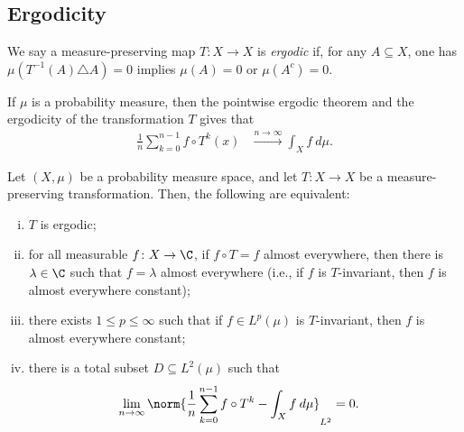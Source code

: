 \documentclass[10pt]{mypackage}
\begin{document}
\subsection{Ergodicity}%
\begin{definition}
  We say a measure-preserving map $T\colon X\rightarrow X$ is \textit{ergodic} if, for any $A\subseteq X$, one has $\mu\left( T^{-1}\left( A \right)\triangle A \right) = 0$ implies $\mu\left( A \right) = 0$ or $\mu\left( A^{c} \right) = 0$.
\end{definition}
If $\mu$ is a probability measure, then the pointwise ergodic theorem and the ergodicity of the transformation $T$ gives that
\begin{align*}
  \frac{1}{n}\sum_{k=0}^{n-1} f\circ T^{k}\left( x \right) &\xrightarrow{n\to\infty} \int_{X}^{} f\:d\mu.
\end{align*}
\begin{proposition}
  Let $\left( X,\mu \right)$ be a probability measure space, and let $T\colon X\rightarrow X$ be a measure-preserving transformation. Then, the following are equivalent:
  \begin{enumerate}[(i)]
    \item $T$ is ergodic;
    \item for all measurable $f\colon X\rightarrow \C$, if $f\circ T = f$ almost everywhere, then there is $\lambda\in \C$ such that $f = \lambda$ almost everywhere (i.e., if $f$ is $T$-invariant, then $f$ is almost everywhere constant);
    \item there exists $1\leq p \leq \infty$ such that if $f\in L^p\left( \mu \right)$ is $T$-invariant, then $f$ is almost everywhere constant;
    \item there is a total subset $D\subseteq L^2\left( \mu \right)$ such that
      \begin{align*}
        \lim_{n\rightarrow\infty} \norm{\frac{1}{n}\sum_{k=0}^{n-1}f\circ T^{k} - \int_{X}^{} f\:d\mu}_{L^2} &= 0.
      \end{align*}
  \end{enumerate}
\end{proposition}
\end{document}
